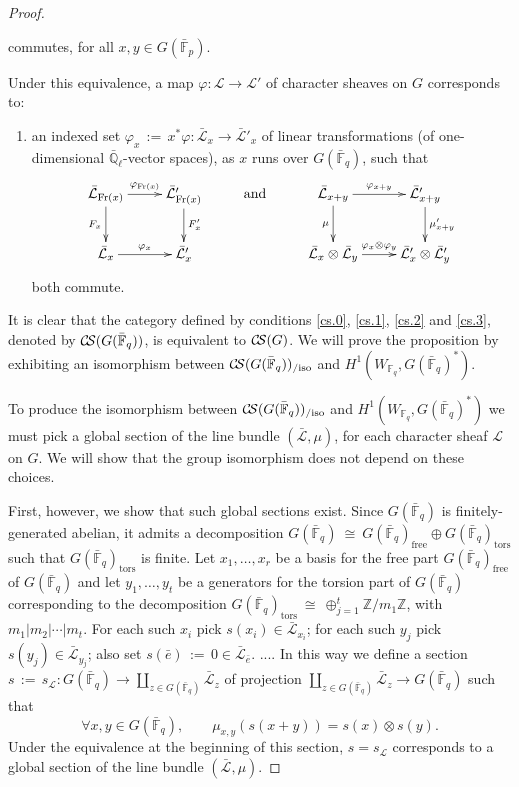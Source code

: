 \documentclass[11pt]{amsart}
\makeatletter
\theoremstyle{plain}
\theoremstyle{definition}
\theoremstyle{remark}
\newcommand{\ZZ}{{\mathbb{Z}}}
\newcommand{\EE}{\mathbb{\bar Q}_\ell}
\newcommand{\bFq}{{\mathbb{\bar F}_q}}
\newcommand{\Fq}{{\mathbb{F}_q}}
\newcommand{\bFp}{{\mathbb{\bar F}_p}}
\newcommand{\Frob}{{\operatorname{Fr}}}
\newcommand{\cdef}[1]{{{\color{cyan}#1}\index{#1}}}
\newcommand{\ceq}{{\, :=\, }}
\newcommand{\iso}{{\ \cong\ }}
\newcommand{\cs}[1]{{\mathcal{#1}}}
\newcommand{\gcs}[1]{{\mathcal{\bar #1}}}
\newcommand{\CS}{{\mathcal{C\hskip-1.8pt S}}}
\newcommand{\labitem}[2]{%
\def\@itemlabel{\textbf{#1}}
\item
\def\@currentlabel{#1}\label{#2}}
\newcommand\Clifton[1]{\marginpar{\smaller\smaller CC: #1}}
\makeatother
\begin{document}
\begin{proof}
\begin{enumerate}
\[{}
\]
commutes, for all $x,y\in G(\bFp)$.
\end{enumerate}
Under this equivalence, a map $\varphi : \cs{L} \to \cs{L'}$ of character sheaves on $G$ corresponds to:
\begin{enumerate}
\labitem{(cs.3)}{cs.3} an indexed set $\varphi_x \ceq x^*\varphi: \gcs{L}_x \to \gcs{L'}_x$ of linear transformations (of one-dimensional $\EE$-vector spaces), as $x$ runs over $G(\bFq)$, such that
\[
\xymatrix{
\ar[d]_{F_x} \gcs{L}_{\Frob(x)} \ar[r]^{\varphi_{\Frob(x)}} & \ar[d]^{F_x'} \gcs{L'}_{\Frob(x)} &\text{and}& \ar[d]_{\mu} \gcs{L}_{x+y} \ar[r]^{\varphi_{x+y}} & \ar[d]^{\mu'_{x+y}} \gcs{L'}_{x+y} \\
\gcs{L}_x \ar[r]^{\varphi_x} & \gcs{L'}_x && \gcs{L}_x\otimes\gcs{L}_y \ar[r]^{\varphi_x\otimes \varphi_y} & \gcs{L'}_x \otimes \gcs{L'}_y\\
}
\]
both commute.
\end{enumerate}
It is clear that the category defined by conditions \ref{cs.0}, \ref{cs.1}, \ref{cs.2} and \ref{cs.3}, denoted by \cdef{$\CS(G(\bFq))$}, is equivalent to $\CS(G)$. We will prove the proposition by exhibiting an isomorphism between $\CS(G(\bFq))_{/\text{iso}}$ and $H^1(W_{\Fq}, G(\bFq)^*)$.

To produce the isomorphism between $\CS(G(\bFq))_{/\text{iso}}$ and $H^1(W_{\Fq}, G(\bFq)^*)$ we must pick a global section of the line bundle $(\gcs{L},\mu)$, for each character sheaf $\cs{L}$ on $G$. We will show that the group isomorphism does not depend on these choices. 

First, however, we show that such global sections exist.
Since $G(\bFq)$ is finitely-generated abelian, it admits a decomposition $G(\bFq) \iso G(\bFq)_\text{free} \oplus G(\bFq)_\text{tors}$ such that $G(\bFq)_\text{tors}$ is finite.
Let $x_1, \ldots , x_r$ be a basis for the free part $G(\bFq)_\text{free}$ of $G(\bFq)$ and let $y_1, \ldots , y_t$ be a generators for the torsion part of $G(\bFq)$ corresponding to the decomposition $G(\bFq)_\text{tors} \iso \oplus_{j=1}^t \ZZ/m_1\ZZ$, with $m_1\vert m_2\vert \cdots \vert m_t$. For each such $x_i$ pick $s(x_i)\in \gcs{L}_{x_i}$; for each such $y_j$ pick $s(y_j) \in \gcs{L}_{y_j}$; also set $s({\bar e}) \ceq 0 \in \gcs{L}_{\bar e}$. .... \Clifton{I'll finish this later.} In this way we define a section $s \ceq s_\cs{L} : G(\bFq) \to \coprod_{z\in G(\bFq)} \gcs{L}_z$ of projection $\coprod_{z\in G(\bFq)} \gcs{L}_z \to G(\bFq)$ such that 
\begin{equation}\label{section}
\forall x,y \in G(\bFq), \qquad \mu_{x,y}(s(x+y)) = s(x)\otimes s(y).
\end{equation}
Under the equivalence at the beginning of this section, $s = s_\cs{L}$ corresponds to a global section of the line bundle $(\gcs{L},\mu)$.


\end{proof}
\end{document}
